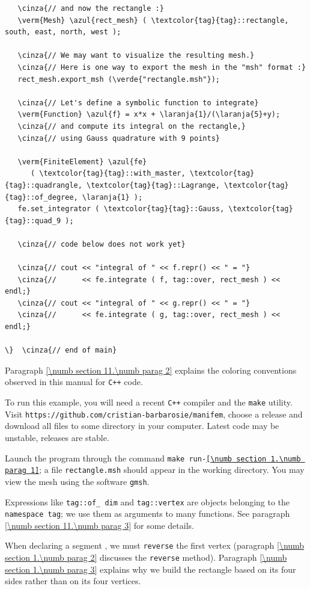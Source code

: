 \begin{Verbatim}
   \cinza{// and now the rectangle :}
   \verm{Mesh} \azul{rect_mesh} ( \textcolor{tag}{tag}::rectangle, south, east, north, west );

   \cinza{// We may want to visualize the resulting mesh.}
   \cinza{// Here is one way to export the mesh in the "msh" format :}
   rect_mesh.export_msh (\verde{"rectangle.msh"});

   \cinza{// Let's define a symbolic function to integrate}
   \verm{Function} \azul{f} = x*x + \laranja{1}/(\laranja{5}+y);
   \cinza{// and compute its integral on the rectangle,}
   \cinza{// using Gauss quadrature with 9 points}

   \verm{FiniteElement} \azul{fe}
      ( \textcolor{tag}{tag}::with_master, \textcolor{tag}{tag}::quadrangle, \textcolor{tag}{tag}::Lagrange, \textcolor{tag}{tag}::of_degree, \laranja{1} );
   fe.set_integrator ( \textcolor{tag}{tag}::Gauss, \textcolor{tag}{tag}::quad_9 );

   \cinza{// code below does not work yet}

   \cinza{// cout << "integral of " << f.repr() << " = "}
   \cinza{//      << fe.integrate ( f, tag::over, rect_mesh ) << endl;}
   \cinza{// cout << "integral of " << g.repr() << " = "}
   \cinza{//      << fe.integrate ( g, tag::over, rect_mesh ) << endl;}

\}  \cinza{// end of main}
\end{Verbatim}

Paragraph \ref{\numb section 11.\numb parag 2} explains the coloring conventions observed
in this manual for {\tt C++} code.

To run this example, you will need a recent {\tt C++} compiler and the {\tt make} utility.
Visit {\small\tt https://github.com/cristian-barbarosie/manifem}, choose a release
and download all files to some directory in your computer.
Latest code may be unstable, releases are stable.

Launch the program through the command
{\small\tt make run-\ref{\numb section 1.\numb parag 1}};
a file {\small\tt rectangle.msh} should appear in the working directory.
You may view the mesh using the software {\tt gmsh}.

Expressions like {\small\tt \textcolor{tag}{tag}::of\_\,dim} and {\small\tt \textcolor{tag}{tag}::vertex} are
objects belonging to the {\small\tt namespace \textcolor{tag}{tag}};
we use them as arguments to many functions.
See paragraph \ref{\numb section 11.\numb parag 3} for some details.

When declaring a segment {\small\tt {}}, we must {\small\tt reverse} the first vertex
(paragraph \ref{\numb section 1.\numb parag 2} discusses the {\small\tt reverse} method).
Paragraph \ref{\numb section 1.\numb parag 3} explains why we build
the rectangle based on its four sides rather than on its four vertices.


